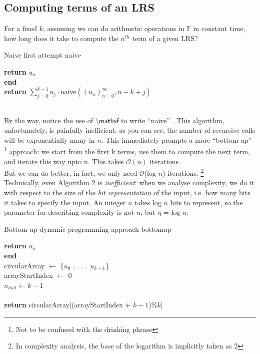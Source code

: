 \documentclass[a4paper,12pt]{article}
\numberwithin{definition}{section}
\numberwithin{mytheorem}{subsection}
\begin{document}
\subsection{Computing terms of an LRS}
For a fixed $k$, assuming we can do arithmetic operations in $\mathbb{F}$ in constant time, how long does it
take to compute the $n^{th}$ term of a given LRS?\\
\begin{algorithm}[ht]
\caption{Naive first attempt \textsf{naive}}
\SetAlgoLined
\DontPrintSemicolon
{}
{\textbf{return} $u_n$}\\
\textbf{end}\\
\textbf{return} $\sum_{j=0}^{k-1} a_{j}\cdot$\textsf{naive}$((u_n)^\infty_{n=0}, n - k + j)$ 
\end{algorithm}\\
By the way, notice the use of $\textsf{\textbackslash mathsf}$ to write \textsf {“naive”} . This algorithm, unfortunately, is painfully
inefficient: as you can see, the number of recursive calls will be exponentially many in $n$. This
immediately prompts a more “bottom-up” \footnote{Not to be confused with the drinking phrase}  approach: we start from the first k terms, use them
to compute the next term, and iterate this way upto n. This takes $\mathcal{O}(n)$ iterations.\\
But we can do better, in fact, we only need $\mathcal{O}$(log $n$) iterations. \footnote{In complexity analysis, the base of the logarithm is implicitly taken as 2}\\
Technically, even Algorithm 2 is \emph{inefficient}: when we analyse complexity, we do it with respect to
the size of the \emph{bit representation} of the input, i.e. how many bits it takes to specify the input. An
integer $n$ takes log $n$ bits to represent, so the parameter for describing complexity is not $n$, but
$\eta$ = log $n$.\\
\begin{algorithm}[ht]
\caption{Bottom up dynamic programming approach  \textsf{bottomup}}
\SetAlgoLined
\DontPrintSemicolon
{}
{\textbf{return} $u_n$}\\
\textbf{end}\\
\textsf{circularArray} $\longleftarrow$ \{$u_0$ , . . . $u_{k−1}$\}\\
\textsf{arrayStartIndex} $\longleftarrow$ 0\\
$n_{last}\longleftarrow k - 1$\\
\\
\textbf{return} \textsf{circularArray[(arrayStartIndex} + $k - 1$\textsf{)}\%$k$\textsf{]}
\end{algorithm}
\end{document}
